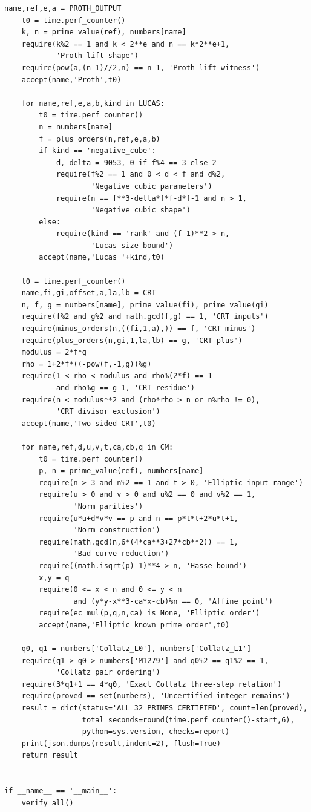 \documentclass[11pt,a4paper]{article}
\theoremstyle{definition}\newtheorem{definition}[theorem]{Definition}
\theoremstyle{remark}\newtheorem{remark}[theorem]{Remark}
\begin{document}
\begin{lstlisting}[label=lst:verifier]
    name,ref,e,a = PROTH_OUTPUT
    t0 = time.perf_counter()
    k, n = prime_value(ref), numbers[name]
    require(k%2 == 1 and k < 2**e and n == k*2**e+1,
            'Proth lift shape')
    require(pow(a,(n-1)//2,n) == n-1, 'Proth lift witness')
    accept(name,'Proth',t0)

    for name,ref,e,a,b,kind in LUCAS:
        t0 = time.perf_counter()
        n = numbers[name]
        f = plus_orders(n,ref,e,a,b)
        if kind == 'negative_cube':
            d, delta = 9053, 0 if f%4 == 3 else 2
            require(f%2 == 1 and 0 < d < f and d%2,
                    'Negative cubic parameters')
            require(n == f**3-delta*f*f-d*f-1 and n > 1,
                    'Negative cubic shape')
        else:
            require(kind == 'rank' and (f-1)**2 > n,
                    'Lucas size bound')
        accept(name,'Lucas '+kind,t0)

    t0 = time.perf_counter()
    name,fi,gi,offset,a,la,lb = CRT
    n, f, g = numbers[name], prime_value(fi), prime_value(gi)
    require(f%2 and g%2 and math.gcd(f,g) == 1, 'CRT inputs')
    require(minus_orders(n,((fi,1,a),)) == f, 'CRT minus')
    require(plus_orders(n,gi,1,la,lb) == g, 'CRT plus')
    modulus = 2*f*g
    rho = 1+2*f*((-pow(f,-1,g))%g)
    require(1 < rho < modulus and rho%(2*f) == 1
            and rho%g == g-1, 'CRT residue')
    require(n < modulus**2 and (rho*rho > n or n%rho != 0),
            'CRT divisor exclusion')
    accept(name,'Two-sided CRT',t0)

    for name,ref,d,u,v,t,ca,cb,q in CM:
        t0 = time.perf_counter()
        p, n = prime_value(ref), numbers[name]
        require(n > 3 and n%2 == 1 and t > 0, 'Elliptic input range')
        require(u > 0 and v > 0 and u%2 == 0 and v%2 == 1,
                'Norm parities')
        require(u*u+d*v*v == p and n == p*t*t+2*u*t+1,
                'Norm construction')
        require(math.gcd(n,6*(4*ca**3+27*cb**2)) == 1,
                'Bad curve reduction')
        require((math.isqrt(p)-1)**4 > n, 'Hasse bound')
        x,y = q
        require(0 <= x < n and 0 <= y < n
                and (y*y-x**3-ca*x-cb)%n == 0, 'Affine point')
        require(ec_mul(p,q,n,ca) is None, 'Elliptic order')
        accept(name,'Elliptic known prime order',t0)

    q0, q1 = numbers['Collatz_L0'], numbers['Collatz_L1']
    require(q1 > q0 > numbers['M1279'] and q0%2 == q1%2 == 1,
            'Collatz pair ordering')
    require(3*q1+1 == 4*q0, 'Exact Collatz three-step relation')
    require(proved == set(numbers), 'Uncertified integer remains')
    result = dict(status='ALL_32_PRIMES_CERTIFIED', count=len(proved),
                  total_seconds=round(time.perf_counter()-start,6),
                  python=sys.version, checks=report)
    print(json.dumps(result,indent=2), flush=True)
    return result


if __name__ == '__main__':
    verify_all()
\end{lstlisting}
\end{document}
